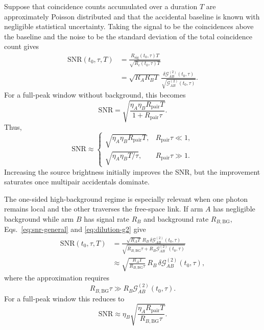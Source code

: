 \documentclass[a4paper,10pt]{article}
\begin{document}
Suppose that coincidence counts accumulated over a duration $T$ are approximately Poisson distributed and that the accidental baseline is known with negligible statistical uncertainty.  Taking the signal to be the coincidences above the baseline and the noise to be the standard deviation of the total coincidence count gives
\begin{align}
    \label{eq:snr-general}
    \mathrm{SNR}(t_0,\tau,T)
    &=\frac{R_{\mathrm{sig}}(t_0,\tau)T}
            {\sqrt{R_c(t_0,\tau)T}} \\
    &=\sqrt{R_A R_B T}\,
      \frac{\delta\mathcal{G}^{(2)}_{AB}(t_0,\tau)}
           {\sqrt{\mathcal{G}^{(2)}_{AB}(t_0,\tau)}}.
\end{align}
For a full-peak window without background, this becomes
\begin{equation}
    \label{eq:spdc-snr}
    \mathrm{SNR}
    =\sqrt{\frac{\eta_A\eta_B R_{\mathrm{pair}}T}
                 {1+R_{\mathrm{pair}}\tau}}.
\end{equation}
Thus,
\begin{equation}
    \mathrm{SNR}\approx
    \begin{cases}
        \sqrt{\eta_A\eta_B R_{\mathrm{pair}}T},
        &R_{\mathrm{pair}}\tau\ll1,\\[4pt]
        \sqrt{\eta_A\eta_B T/\tau},
        &R_{\mathrm{pair}}\tau\gg1.
    \end{cases}
\end{equation}
Increasing the source brightness initially improves the SNR, but the improvement saturates once multipair accidentals dominate.

The one-sided high-background regime is especially relevant when one photon remains local and the other traverses the free-space link.  If arm $A$ has negligible background while arm $B$ has signal rate $R_B$ and background rate $R_{B,\mathrm{BG}}$, Eqs.~\eqref{eq:snr-general} and \eqref{eq:dilution-g2} give
\begin{align}
    \label{eq:snr-high-background}
    \mathrm{SNR}(t_0,\tau,T)
    &=\frac{\sqrt{R_A T}\,R_B\,
            \delta\mathcal{G}^{(2)}_{AB}(t_0,\tau)}
           {\sqrt{R_{B,\mathrm{BG}}\tau
                  +R_B\mathcal{G}^{(2)}_{AB}(t_0,\tau)}} \\
    &\approx
      \sqrt{\frac{R_A T}{R_{B,\mathrm{BG}}\tau}}\,
      R_B\,\delta\mathcal{G}^{(2)}_{AB}(t_0,\tau),
\end{align}
where the approximation requires
\begin{equation}
    R_{B,\mathrm{BG}}\tau
    \gg R_B\mathcal{G}^{(2)}_{AB}(t_0,\tau).
\end{equation}
For a full-peak window this reduces to
\begin{equation}
    \mathrm{SNR}
    \approx\eta_B\sqrt{
       \frac{\eta_A R_{\mathrm{pair}}T}
            {R_{B,\mathrm{BG}}\tau}}.
\end{equation}
\end{document}
